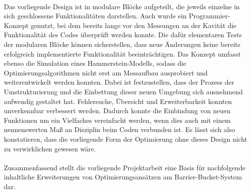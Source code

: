 \documentclass[../Report.tex]{subfiles}
\begin{document}
\\ 
Das vorliegende Design ist in modulare Blöcke aufgeteilt, die jeweils einzelne in sich geschlossene Funktionalitäten darstellen. Auch wurde ein Programmier-Konzept genutzt, bei dem bereits lange vor den Messungen an der Kavität die Funktionalität des Codes überprüft werden konnte. Die dafür elementaren Tests der modularen Blöcke können sicherstellen, dass neue Änderungen keine bereits erfolgreich implementierte Funktionalität beeinträchtigen.
Das Konzept umfasst ebenso die Simulation eines Hammerstein-Modells, sodass die Optimierungsalgorithmen nicht erst am Messaufbau ausprobiert und weiterentwickelt werden konnten.
Dabei ist festzustellen, dass der Prozess der Umstrukturierung und die Einbettung dieser neuen Umgebung sich ausnehmend aufwendig gestaltet hat. Fehlersuche, Übersicht und Erweiterbarkeit konnten unverkennbar verbessert werden. Dadurch konnte die Einbindung von neuen Funktionen um ein Vielfaches vereinfacht werden, wenn dies auch mit einem nennenswerten Maß an Disziplin beim Coden verbunden ist. Es lässt sich also konstatieren, dass die vorliegende Form der Optimierung ohne dieses Design nicht zu verwirklichen gewesen wäre.
\\
\\
Zusammenfassend stellt die vorliegende Projektarbeit eine Basis für nachfolgende inhaltliche Erweiterungen von Optimierungsansätzen am Barrier-Bucket-System dar.
\end{document}
